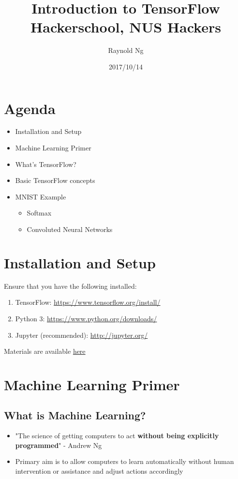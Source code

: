 \documentclass[11pt]{article}
\author{Raynold Ng}
\date{2017/10/14}
\title{Introduction to TensorFlow\\\medskip
\large Hackerschool, NUS Hackers}
\begin{document}
\maketitle
\section*{Agenda}
\label{sec:orgc63bbd7}
\begin{itemize}
\item Installation and Setup
\item Machine Learning Primer
\item What's TensorFlow?
\item Basic TensorFlow concepts
\item MNIST Example
\begin{itemize}
\item Softmax
\item Convoluted Neural Networks
\end{itemize}
\end{itemize}
\section*{Installation and Setup}
\label{sec:orgdc4fc67}

Ensure that you have the following installed:
\begin{enumerate}
\item TensorFlow: \url{https://www.tensorflow.org/install/}
\item Python 3: \url{https://www.python.org/downloads/}
\item Jupyter (recommended): \url{http://jupyter.org/}
\end{enumerate}

Materials are available \href{https://github.com/raynoldng/hackerschool-tensorflow}{here}
\section*{Machine Learning Primer}
\label{sec:org6b8b5f4}
\subsection*{What is Machine Learning?}
\label{sec:orgd9b94fb}
\begin{itemize}
\item "The science of getting computers to act \textbf{without being explicitly programmed}" - Andrew Ng
\item Primary aim is to allow computers to learn automatically without human
intervention or assistance and adjust actions accordingly
\end{itemize}
\end{document}

